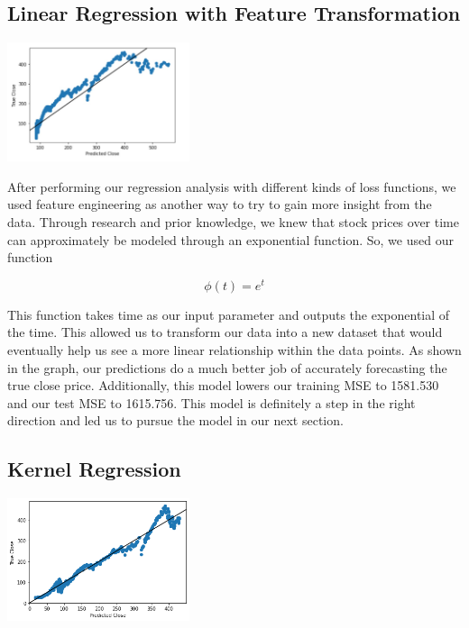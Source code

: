 \documentclass[final,5p,times,twocolumn,authoryear, 12pt]{elsarticle}
\begin{document}
\subsection{Linear Regression with Feature Transformation}

\includegraphics[width=0.4\textwidth, angle=0]{linregFT.jpeg}

After performing our regression analysis with different kinds of loss functions, we used feature engineering as another way to try to gain more insight from the data. Through research and prior knowledge, we knew that stock prices over time can approximately be modeled through an exponential function. So, we used our function

\begin{adjustwidth}{2.8cm}{}
    \[
        \phi(t) = e^t
    \]
\end{adjustwidth}

This function takes time as our input parameter and outputs the exponential of the time. This allowed us to transform our data into a new dataset that would eventually help us see a more linear relationship within the data points. As shown in the graph, our predictions do a much better job of accurately forecasting the true close price. Additionally, this model lowers our training MSE to 1581.530 and our test MSE to 1615.756. This model is definitely a step in the right direction and led us to pursue the model in our next section.

\subsection{Kernel Regression}

\includegraphics[width=0.4\textwidth, angle=0]{linregRBF.png}
\end{document}
